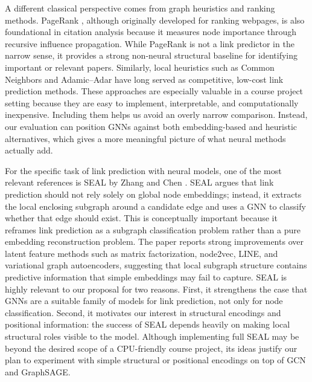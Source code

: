 \documentclass[11pt,a4paper]{article}
\begin{document}
A different classical perspective comes from graph heuristics and ranking methods.
PageRank \cite{page1999pagerank}, although originally developed for ranking webpages,
is also foundational in citation analysis because it measures node importance
through recursive influence propagation.
While PageRank is not a link predictor in the narrow sense,
it provides a strong non-neural structural baseline for identifying important or relevant papers.
Similarly, local heuristics such as Common Neighbors and Adamic--Adar
have long served as competitive, low-cost link prediction methods.
These approaches are especially valuable in a course project setting
because they are easy to implement, interpretable, and computationally inexpensive.
Including them helps us avoid an overly narrow comparison.
Instead, our evaluation can position GNNs against both embedding-based and heuristic alternatives,
which gives a more meaningful picture of what neural methods actually add.

For the specific task of link prediction with neural models,
one of the most relevant references is SEAL by Zhang and Chen \cite{zhang2018link}.
SEAL argues that link prediction should not rely solely on global node embeddings;
instead, it extracts the local enclosing subgraph around a candidate edge
and uses a GNN to classify whether that edge should exist.
This is conceptually important because it reframes link prediction
as a subgraph classification problem rather than a pure embedding reconstruction problem.
The paper reports strong improvements over latent feature methods such as
matrix factorization, node2vec, LINE, and variational graph autoencoders,
suggesting that local subgraph structure contains predictive information
that simple embeddings may fail to capture.
SEAL is highly relevant to our proposal for two reasons.
First, it strengthens the case that GNNs are a suitable family of models for link prediction,
not only for node classification.
Second, it motivates our interest in structural encodings and positional information:
the success of SEAL depends heavily on making local structural roles visible to the model.
Although implementing full SEAL may be beyond the desired scope of a CPU-friendly course project,
its ideas justify our plan to experiment with simple structural or positional encodings
on top of GCN and GraphSAGE.
\end{document}
